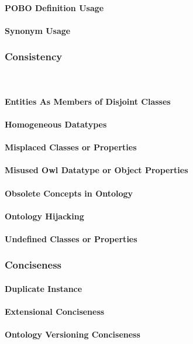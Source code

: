 \paragraph{POBO Definition Usage}
\paragraph{Synonym Usage}
\subsubsection{Consistency}
\

\paragraph{Entities As Members of Disjoint Classes}
\paragraph{Homogeneous Datatypes}
\paragraph{Misplaced Classes or Properties}
\paragraph{Misused Owl Datatype or Object Properties}
\paragraph{Obsolete Concepts in Ontology}
\paragraph{Ontology Hijacking}
\paragraph{Undefined Classes or Properties}

\subsubsection{Conciseness}

\paragraph{Duplicate Instance}

\paragraph{Extensional Conciseness}

\paragraph{Ontology Versioning Conciseness}



